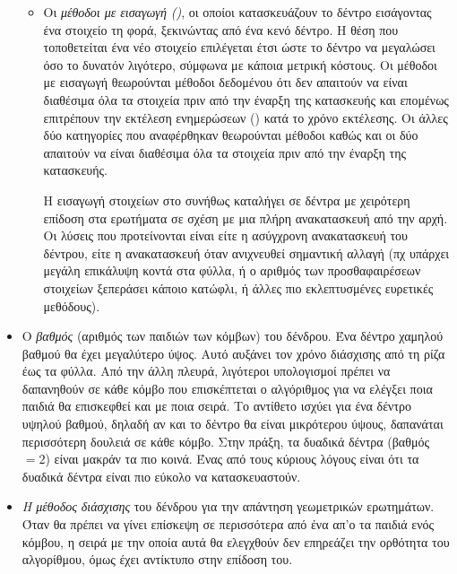 \begin{itemize}
\begin{itemize}
        \item Οι \textit{μέθοδοι με εισαγωγή ()}, οι 
        οποίοι κατασκευάζουν το δέντρο εισάγοντας ένα στοιχείο τη φορά, 
        ξεκινώντας από ένα κενό δέντρο. 
        Η θέση που τοποθετείται ένα νέο στοιχείο επιλέγεται έτσι ώστε 
        το δέντρο να μεγαλώσει όσο το δυνατόν λιγότερο, σύμφωνα με κάποια 
        μετρική κόστους.
        Οι μέθοδοι με εισαγωγή θεωρούνται  μέθοδοι δεδομένου ότι
        δεν απαιτούν να είναι διαθέσιμα όλα τα στοιχεία πριν από την έναρξη
        της κατασκευής και επομένως επιτρέπουν την εκτέλεση ενημερώσεων 
        () κατά το χρόνο εκτέλεσης.
        Οι άλλες δύο κατηγορίες που αναφέρθηκαν θεωρούνται  
        μέθοδοι καθώς και οι δύο απαιτούν να είναι διαθέσιμα όλα τα 
        στοιχεία πριν από την έναρξη της κατασκευής. 

        Η εισαγωγή στοιχείων στο  συνήθως καταλήγει σε δέντρα με 
        χειρότερη επίδοση στα ερωτήματα σε σχέση με μια πλήρη ανακατασκευή
        από την αρχή. Οι λύσεις που προτείνονται είναι είτε η ασύγχρονη 
        ανακατασκευή του δέντρου, είτε η ανακατασκευή όταν ανιχνευθεί 
        σημαντική αλλαγή (πχ υπάρχει μεγάλη επικάλυψη κοντά στα φύλλα, 
        ή ο αριθμός των προσθαφαιρέσεων στοιχείων ξεπεράσει κάποιο 
        κατώφλι, ή άλλες πιο εκλεπτυσμένες ευρετικές μεθόδους).
    \end{itemize}
    
    \item Ο \textit{βαθμός} (αριθμός των παιδιών των κόμβων) του 
    δένδρου. 
    Ένα δέντρο χαμηλού βαθμού θα έχει μεγαλύτερο ύψος. 
    Αυτό αυξάνει τον χρόνο διάσχισης από τη ρίζα έως τα φύλλα.
    Από την άλλη πλευρά, λιγότεροι υπολογισμοί πρέπει να δαπανηθούν
    σε κάθε κόμβο που επισκέπτεται ο αλγόριθμος για να ελέγξει ποια 
    παιδιά θα επισκεφθεί και με ποια σειρά. 
    Το αντίθετο ισχύει για ένα δέντρο υψηλού βαθμού, δηλαδή αν και το δέντρο
    θα είναι μικρότερου ύψους, δαπανάται περισσότερη δουλειά σε κάθε κόμβο.
    Στην πράξη, τα δυαδικά δέντρα (βαθμός $ = 2$) είναι μακράν τα πιο κοινά. Ένας από τους κύριους λόγους είναι ότι τα δυαδικά δέντρα είναι πιο εύκολο να κατασκευαστούν.
    
    \item \textit{Η μέθοδος διάσχισης} του δένδρου για την απάντηση 
    γεωμετρικών ερωτημάτων. Όταν θα πρέπει να γίνει επίσκεψη σε 
    περισσότερα από ένα απ'ο τα παιδιά ενός κόμβου, 
    η σειρά με την οποία αυτά θα ελεγχθούν 
    δεν επηρεάζει την ορθότητα του αλγορίθμου, όμως έχει αντίκτυπο 
    στην επίδοση του.
\end{itemize}

